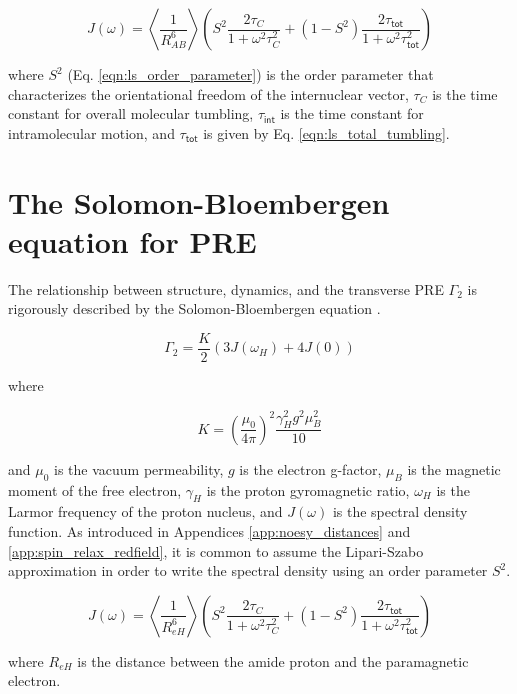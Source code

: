 \documentclass[9pt,review]{livecoms}
\begin{document}
\begin{equation}
\label{eqn:spin_relaxation_spectral_density}
J(\omega) = \left \langle \frac {1} {R_{AB}^6} \right \rangle \left( S^2 \frac {2 \tau_C} {1 + \omega^2 \tau_C^2} + \left( 1 - S^2 \right) \frac {2 \tau_{\mathsf{tot}}} {1 + \omega^2 \tau_{\mathsf{tot}}^2} \right)
\end{equation}

\noindent where $S^2$ (Eq. \ref{eqn:ls_order_parameter}) is the order parameter that characterizes the orientational freedom of the internuclear vector, $\tau_C$ is the time constant for overall molecular tumbling, $\tau_{\mathsf{int}}$ is the time constant for intramolecular motion, and $\tau_{\mathsf{tot}}$ is given by Eq. \ref{eqn:ls_total_tumbling}.

\section{The Solomon-Bloembergen equation for PRE}
\label{app:pre_solomon}

The relationship between structure, dynamics, and the transverse PRE $\Gamma_2$ is rigorously described by the Solomon-Bloembergen equation \cite{solomon_nuclear_1956}.

\begin{equation}
\label{eqn:solomon-bloembergen}
\Gamma_2 = \frac {K} {2} \left( 3 J(\omega_H) + 4 J(0) \right)
\end{equation}

\noindent where

\begin{equation}
\label{eqn:pre_constant}
K = \left( \frac {\mu_0} {4 \pi} \right)^2 \frac {\gamma_H^2 g^2 \mu_B^2} {10}
\end{equation}

\noindent and $\mu_0$ is the vacuum permeability, $g$ is the electron g-factor, $\mu_B$ is the magnetic moment of the free electron, $\gamma_H$ is the proton gyromagnetic ratio, $\omega_H$ is the Larmor frequency of the proton nucleus, and $J(\omega)$ is the spectral density function.
As introduced in Appendices \ref{app:noesy_distances} and \ref{app:spin_relax_redfield}, it is common to assume the Lipari-Szabo approximation in order to write the spectral density using an order parameter $S^2$.

\begin{equation}
\label{eqn:pre_spectral_density}
J(\omega) = \left \langle \frac {1} {R_{eH}^6} \right \rangle \left( S^2 \frac {2 \tau_C} {1 + \omega^2 \tau_C^2} + \left( 1 - S^2 \right) \frac {2 \tau_{\mathsf{tot}}} {1 + \omega^2 \tau_{\mathsf{tot}}^2} \right)
\end{equation}

where $R_{eH}$ is the distance between the amide proton and the paramagnetic electron.
\end{document}
